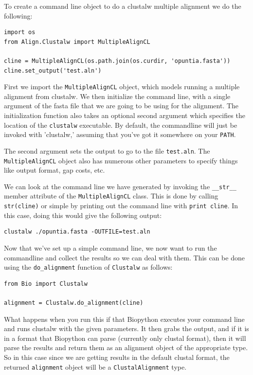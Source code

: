 \documentclass{report}
\begin{document}
To create a command line object to do a clustalw multiple alignment we do the following:

\begin{verbatim}
import os
from Align.Clustalw import MultipleAlignCL

cline = MultipleAlignCL(os.path.join(os.curdir, 'opuntia.fasta'))
cline.set_output('test.aln')
\end{verbatim}

First we import the \verb|MultipleAlignCL| object, which models running a multiple alignment from clustalw. We then initialize the command line, with a single argument of the fasta file that we are going to be using for the alignment. The initialization function also takes an optional second argument which specifies the location of the \verb|clustalw| executable. By default, the commandline will just be invoked with 'clustalw,' assuming that you've got it somewhere on your \verb|PATH|.


The second argument sets the output to go to the file \verb|test.aln|. The \verb|MultipleAlignCL| object also has numerous other parameters to specify things like output format, gap costs, etc. 


We can look at the command line we have generated by invoking the \verb|__str__| member attribute of the \verb|MultipleAlignCL| class. This is done by calling \verb|str(cline)| or simple by printing out the command line with \verb|print cline|. In this case, doing this would give the following output:

\begin{verbatim}
clustalw ./opuntia.fasta -OUTFILE=test.aln
\end{verbatim}

Now that we've set up a simple command line, we now want to run the commandline and collect the results so we can deal with them. This can be done using the \verb|do_alignment| function of \verb|Clustalw| as follows:

\begin{verbatim}
from Bio import Clustalw

alignment = Clustalw.do_alignment(cline)
\end{verbatim}

What happens when you run this if that Biopython executes your command line and runs clustalw with the given parameters. It then grabs the output, and if it is in a format that Biopython can parse (currently only clustal format), then it will parse the results and return them as an alignment object of the appropriate type. So in this case since we are getting results in the default clustal format, the returned \verb|alignment| object will be a \verb|ClustalAlignment| type.
\end{document}
